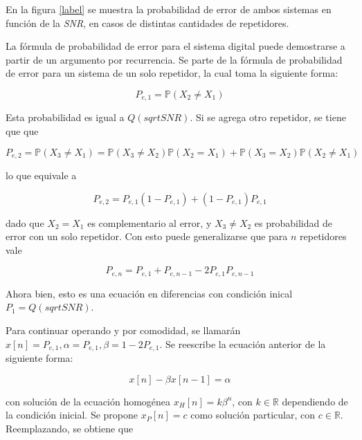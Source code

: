 En la figura \ref{label} se muestra la probabilidad de error de ambos sistemas en función de la \textit{SNR}, en casos de distintas cantidades de repetidores.








La fórmula de probabilidad de error para el sistema digital puede demostrarse a partir de un argumento por recurrencia. Se parte de la fórmula de probabilidad de error para un sistema de un solo repetidor, la cual toma la siguiente forma:

\begin{equation}
P_{e,1}=\mathbb{P}(X_2\neq X_1) 
\end{equation} 

Esta probabilidad es igual a $Q(sqrt{SNR})$. Si se agrega otro repetidor, se tiene que que

\begin{equation}
P_{e,2}=\mathbb{P}(X_3\neq X_1)=\mathbb{P}(X_3\neq X_2)\mathbb{P}(X_2 = X_1)+\mathbb{P}(X_3 = X_2)\mathbb{P}(X_2\neq X_1)
\end{equation} 

lo que equivale a 

\begin{equation}
P_{e,2}=P_{e,1}(1-P_{e,1})+(1-P_{e,1})P_{e,1}
\end{equation} 

dado que $X_2 = X_1$ es complementario al error, y $X_3 \neq X_2$ es probabilidad de error con un solo repetidor. Con esto puede generalizarse que para $n$ repetidores vale

\begin{equation}
P_{e,n}=P_{e,1}+P_{e,n-1}-2P_{e,1}P_{e,n-1}
\end{equation} 

Ahora bien, esto es una ecuación en diferencias con condición inical $P_1 = Q(sqrt{SNR})$. 

Para continuar operando y por comodidad, se llamarán $x[n]=P_{e,1},\alpha=P_{e,1},\beta=1-2P_{e,1}$. Se reescribe la ecuación anterior de la siguiente forma:

\begin{equation}
x[n]-\beta x[n-1]=\alpha
\end{equation} 

con solución de la ecuación homogénea $x_H[n]=k\beta^n$, con $k \in \mathbb{R}$ dependiendo de la condición inicial. Se propone $x_P[n]=c$ como solución particular, con $c\in\mathbb{R}$. Reemplazando, se obtiene que 

